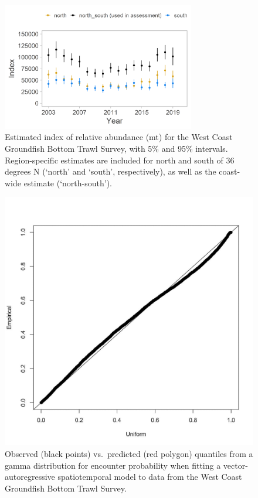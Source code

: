 \documentclass[11pt,
  english,
  a4paper,
]{article}
\begin{document}
\tagmcend\tagstructend


\begin{figure}
\centering
\includegraphics[width=0.75\textwidth,height=0.75\textheight]{figs/Index-Biomass.png}
\caption{Estimated index of relative abundance (mt) for the West Coast Groundfish Bottom Trawl Survey, with 5\% and 95\% intervals. Region-specific estimates are included for north and south of 36 degrees N (`north' and `south', respectively), as well as the coast-wide estimate (`north-south').\label{fig:WCGBTindexest}}
\end{figure}

\tagmcend\tagstructend


\begin{figure}
\centering
\includegraphics[width=1\textwidth,height=0.75\textheight]{figs/quantile_residuals.jpg}
\caption{Observed (black points) vs.~predicted (red polygon) quantiles from a gamma distribution for encounter probability when fitting a vector-autoregressive spatiotemporal model to data from the West Coast Groundfish Bottom Trawl Survey. \label{fig:WCGBTQQ}}
\end{figure}
\end{document}
